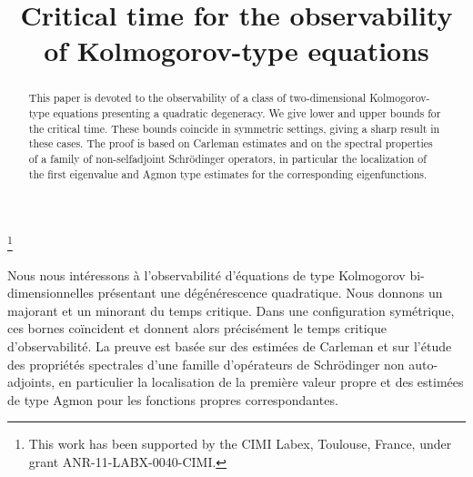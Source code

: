 \documentclass[JEP,XML,SOM,Unicode]{cedram}
\theoremstyle{plain}
\theoremstyle{definition}
\newcommand{\1}{\mathds 1}
\begin{document}
\title{Critical time for the observability of Kolmogorov-type equations}

\author[\initial{J.} \lastname{Dardé}]{ }
\address{Institut de Mathématiques de Toulouse, UMR5219, Univ.\ de Toulouse, CNRS, UPS\\
F-31062 Toulouse Cedex 9, France}

\author[\initial{J.} \lastname{Royer}]{ }
\address{Institut de Mathématiques de Toulouse, UMR5219, Univ.\ de Toulouse, CNRS, UPS\\
F-31062 Toulouse Cedex 9, France}

\thanks{This work has been supported by the CIMI Labex, Toulouse, France, under grant ANR-11-LABX-0040-CIMI.}

\begin{abstract}
This paper is devoted to the observability of a class of two-di\-men\-sion\-al Kol\-mo\-go\-rov-type equations presenting a quadratic degeneracy. We give lower and upper bounds for the critical time. These bounds coincide in symmetric settings, giving a sharp result in these cases. The proof is based on Carleman estimates and on the spectral properties of a family of non-selfadjoint Schrödinger operators, in particular the localization of the first eigenvalue and Agmon type estimates for the corresponding eigenfunctions.
\end{abstract}





\begin{altabstract}
Nous nous intéressons à l'observabilité d'équations de type Kolmogorov bi-dimensionnelles présentant une dégénérescence quadratique. Nous donnons un majorant et un minorant du temps critique. Dans une configuration symétrique, ces bornes coïncident et donnent alors précisément le temps critique d'observabilité. La preuve est basée sur des estimées de Carleman et sur l'étude des propriétés spectrales d'une famille d'opérateurs de Schrödinger non auto-adjoints, en particulier la localisation de la première valeur propre et des estimées de type Agmon pour les fonctions propres correspondantes.
\end{altabstract}
\end{document}
